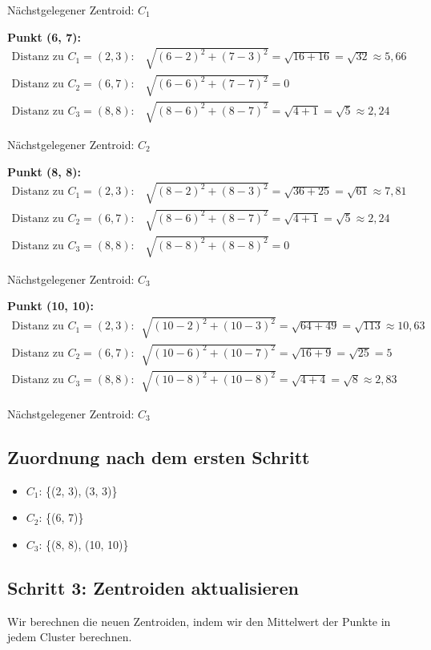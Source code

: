 \documentclass{article}
\begin{document}
Nächstgelegener Zentroid: \( C_1 \)

\textbf{Punkt (6, 7):}
\begin{align*}
\text{Distanz zu } C_1 = (2, 3): & \quad \sqrt{(6-2)^2 + (7-3)^2} = \sqrt{16 + 16} = \sqrt{32} \approx 5{,}66 \\
\text{Distanz zu } C_2 = (6, 7): & \quad \sqrt{(6-6)^2 + (7-7)^2} = 0 \\
\text{Distanz zu } C_3 = (8, 8): & \quad \sqrt{(8-6)^2 + (8-7)^2} = \sqrt{4 + 1} = \sqrt{5} \approx 2{,}24
\end{align*}

Nächstgelegener Zentroid: \( C_2 \)

\textbf{Punkt (8, 8):}
\begin{align*}
\text{Distanz zu } C_1 = (2, 3): & \quad \sqrt{(8-2)^2 + (8-3)^2} = \sqrt{36 + 25} = \sqrt{61} \approx 7{,}81 \\
\text{Distanz zu } C_2 = (6, 7): & \quad \sqrt{(8-6)^2 + (8-7)^2} = \sqrt{4 + 1} = \sqrt{5} \approx 2{,}24 \\
\text{Distanz zu } C_3 = (8, 8): & \quad \sqrt{(8-8)^2 + (8-8)^2} = 0
\end{align*}

Nächstgelegener Zentroid: \( C_3 \)

\textbf{Punkt (10, 10):}
\begin{align*}
\text{Distanz zu } C_1 = (2, 3): & \quad \sqrt{(10-2)^2 + (10-3)^2} = \sqrt{64 + 49} = \sqrt{113} \approx 10{,}63 \\
\text{Distanz zu } C_2 = (6, 7): & \quad \sqrt{(10-6)^2 + (10-7)^2} = \sqrt{16 + 9} = \sqrt{25} = 5 \\
\text{Distanz zu } C_3 = (8, 8): & \quad \sqrt{(10-8)^2 + (10-8)^2} = \sqrt{4 + 4} = \sqrt{8} \approx 2{,}83
\end{align*}

Nächstgelegener Zentroid: \( C_3 \)

\subsection*{Zuordnung nach dem ersten Schritt}
\begin{itemize}
    \item \( C_1 \): \{(2, 3), (3, 3)\}
    \item \( C_2 \): \{(6, 7)\}
    \item \( C_3 \): \{(8, 8), (10, 10)\}
\end{itemize}

\subsection*{Schritt 3: Zentroiden aktualisieren}
Wir berechnen die neuen Zentroiden, indem wir den Mittelwert der Punkte in jedem Cluster berechnen.
\end{document}
